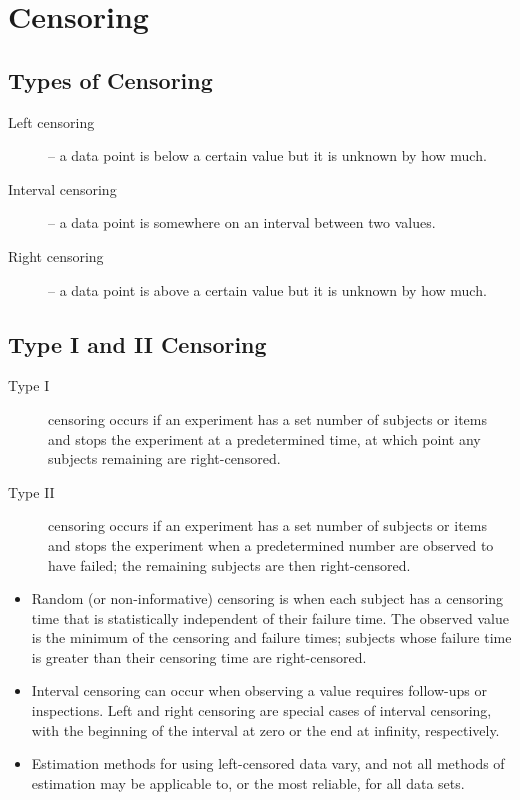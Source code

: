 \documentclass[MasterNotes.tex]{subfiles}
\begin{document}
\section*{Censoring}
\subsection*{Types of Censoring}
\begin{description}
\item[Left censoring] – a data point is below a certain value but it is unknown by how much.
\item[Interval censoring] – a data point is somewhere on an interval between two values.
\item[Right censoring] – a data point is above a certain value but it is unknown by how much.
\end{description}


\subsection*{Type I and II Censoring}
\begin{description}
\item[Type I] censoring occurs if an experiment has a set number of subjects or items and stops the experiment at a predetermined time, at which point any subjects remaining are right-censored.
\item[Type II] censoring occurs if an experiment has a set number of subjects or items and stops the experiment when a predetermined number are observed to have failed; the remaining subjects are then right-censored.
\end{description}
\begin{itemize}
\item Random (or non-informative) censoring is when each subject has a censoring time that is statistically independent of their failure time. The observed value is the minimum of the censoring and failure times; subjects whose failure time is greater than their censoring time are right-censored.
\item Interval censoring can occur when observing a value requires follow-ups or inspections. Left and right censoring are special cases of interval censoring, with the beginning of the interval at zero or the end at infinity, respectively.
\item Estimation methods for using left-censored data vary, and not all methods of estimation may be applicable to, or the most reliable, for all data sets.
\end{itemize}
\end{document}
